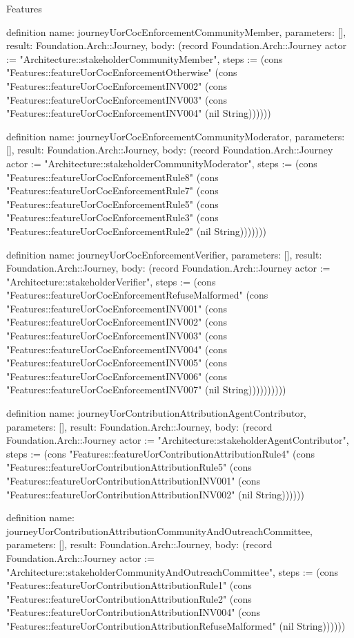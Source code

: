 \begin{lexlean}{Features}
\begin{semanticmodule}
definition{
  name: journeyUorCocEnforcementCommunityMember,
  parameters: [],
  result: Foundation.Arch::Journey,
  body: (record Foundation.Arch::Journey {actor := "Architecture::stakeholderCommunityMember", steps := (cons "Features::featureUorCocEnforcementOtherwise" (cons "Features::featureUorCocEnforcementINV002" (cons "Features::featureUorCocEnforcementINV003" (cons "Features::featureUorCocEnforcementINV004" (nil String)))))})
}

definition{
  name: journeyUorCocEnforcementCommunityModerator,
  parameters: [],
  result: Foundation.Arch::Journey,
  body: (record Foundation.Arch::Journey {actor := "Architecture::stakeholderCommunityModerator", steps := (cons "Features::featureUorCocEnforcementRule8" (cons "Features::featureUorCocEnforcementRule7" (cons "Features::featureUorCocEnforcementRule5" (cons "Features::featureUorCocEnforcementRule3" (cons "Features::featureUorCocEnforcementRule2" (nil String))))))})
}

definition{
  name: journeyUorCocEnforcementVerifier,
  parameters: [],
  result: Foundation.Arch::Journey,
  body: (record Foundation.Arch::Journey {actor := "Architecture::stakeholderVerifier", steps := (cons "Features::featureUorCocEnforcementRefuseMalformed" (cons "Features::featureUorCocEnforcementINV001" (cons "Features::featureUorCocEnforcementINV002" (cons "Features::featureUorCocEnforcementINV003" (cons "Features::featureUorCocEnforcementINV004" (cons "Features::featureUorCocEnforcementINV005" (cons "Features::featureUorCocEnforcementINV006" (cons "Features::featureUorCocEnforcementINV007" (nil String)))))))))})
}

definition{
  name: journeyUorContributionAttributionAgentContributor,
  parameters: [],
  result: Foundation.Arch::Journey,
  body: (record Foundation.Arch::Journey {actor := "Architecture::stakeholderAgentContributor", steps := (cons "Features::featureUorContributionAttributionRule4" (cons "Features::featureUorContributionAttributionRule5" (cons "Features::featureUorContributionAttributionINV001" (cons "Features::featureUorContributionAttributionINV002" (nil String)))))})
}

definition{
  name: journeyUorContributionAttributionCommunityAndOutreachCommittee,
  parameters: [],
  result: Foundation.Arch::Journey,
  body: (record Foundation.Arch::Journey {actor := "Architecture::stakeholderCommunityAndOutreachCommittee", steps := (cons "Features::featureUorContributionAttributionRule1" (cons "Features::featureUorContributionAttributionRule2" (cons "Features::featureUorContributionAttributionINV004" (cons "Features::featureUorContributionAttributionRefuseMalformed" (nil String)))))})
}


\end{semanticmodule}
\end{lexlean}
